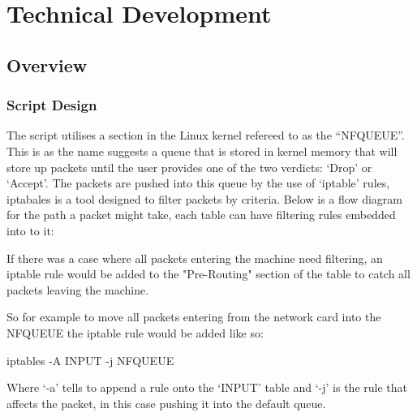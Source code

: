 \chapter{Technical Development}

\section{Overview}

\subsection{Script Design}
The script utilises a section in the Linux kernel refereed to as the ``NFQUEUE''. This is as the name suggests a queue that is stored in kernel memory that will store up packets until the user provides one of the two verdicts: `Drop' or `Accept'. The packets are pushed into this queue by the use of `iptable' rules, iptabales is a tool designed to filter packets by criteria. Below is a flow diagram for the path a packet might take, each table can have filtering rules embedded into to it:



If there was a case where all packets entering the machine need filtering, an iptable rule would be added to the "Pre-Routing" section of the table to catch all packets leaving the machine. 

So for example to move all packets entering from the network card into the NFQUEUE the iptable rule would be added like so:
\begin{center}
	\begin{console_font}
		\large{iptables -A INPUT -j NFQUEUE}
	\end{console_font} 
\end{center}
Where `-a' tells to append a rule onto the `INPUT' table and `-j' is the rule that affects the packet, in this case pushing it into the default queue.


